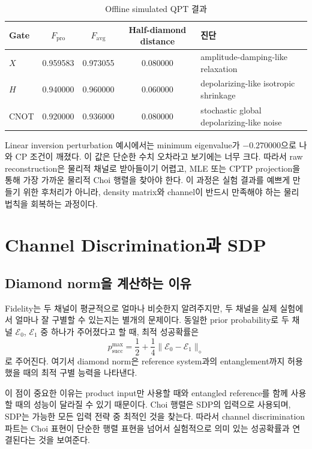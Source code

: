 \documentclass[11pt,a4paper]{article}
\newcommand{\E}{\mathcal{E}}
\begin{document}
\begin{table}[H]
\centering
\small
\begin{tabularx}{\textwidth}{lcccX}
\toprule
Gate & $F_{\mathrm{pro}}$ & $F_{\mathrm{avg}}$ & Half-diamond distance & 진단 \\
\midrule
$X$ & 0.959583 & 0.973055 & 0.080000 & amplitude-damping-like relaxation \\
$H$ & 0.940000 & 0.960000 & 0.060000 & depolarizing-like isotropic shrinkage \\
CNOT & 0.920000 & 0.936000 & 0.080000 & stochastic global depolarizing-like noise \\
\bottomrule
\end{tabularx}
\caption{Offline simulated QPT 결과}
\label{tab:qpt-results}
\end{table}

Linear inversion perturbation 예시에서는 minimum eigenvalue가 $-0.270000$으로 나와 CP 조건이 깨졌다. 이 값은 단순한 수치 오차라고 보기에는 너무 크다. 따라서 raw reconstruction은 물리적 채널로 받아들이기 어렵고, MLE 또는 CPTP projection을 통해 가장 가까운 물리적 Choi 행렬을 찾아야 한다. 이 과정은 실험 결과를 예쁘게 만들기 위한 후처리가 아니라, density matrix와 channel이 반드시 만족해야 하는 물리 법칙을 회복하는 과정이다.

\section{Channel Discrimination과 SDP}

\subsection{Diamond norm을 계산하는 이유}

Fidelity는 두 채널이 평균적으로 얼마나 비슷한지 알려주지만, 두 채널을 실제 실험에서 얼마나 잘 구별할 수 있는지는 별개의 문제이다. 동일한 prior probability로 두 채널 $\E_0$, $\E_1$ 중 하나가 주어졌다고 할 때, 최적 성공확률은
\[
p_{\mathrm{succ}}^{\max}
=\frac12+\frac14\|\E_0-\E_1\|_\diamond
\]
로 주어진다. 여기서 diamond norm은 reference system과의 entanglement까지 허용했을 때의 최적 구별 능력을 나타낸다.

이 점이 중요한 이유는 product input만 사용할 때와 entangled reference를 함께 사용할 때의 성능이 달라질 수 있기 때문이다. Choi 행렬은 SDP의 입력으로 사용되며, SDP는 가능한 모든 입력 전략 중 최적인 것을 찾는다. 따라서 channel discrimination 파트는 Choi 표현이 단순한 행렬 표현을 넘어서 실험적으로 의미 있는 성공확률과 연결된다는 것을 보여준다.
\end{document}
